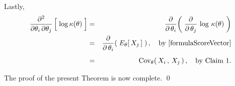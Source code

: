 \begin{enumerate}
	\vskip 0.5cm
	\noindent
	Lastly,
	\begin{eqnarray*}
	\dfrac{\partial^{2}}{\partial\theta_{i}\,\partial\theta_{j}} \left[\;\overset{{\color{white}.}}{\log} \, \kappa(\theta)\;\right]
	&=&
		\dfrac{\partial}{\partial\,\theta_{i}}\!
		\left(\;
			\dfrac{\partial}{\partial\,\theta_{j}}\, \log \, \kappa(\theta)
		\;\right)
	\\
	&=&
		\dfrac{\partial}{\partial\,\theta_{i}}\!
		\left(\; E_{\theta}\!\left[\,X_{j}\,\right] \;\right),
		\quad
		\textnormal{by \eqref{formulaScoreVector}}
	\\
	&\overset{{\color{white}\vert}}{=}&
		\Cov_{\theta}\!\left(\,X_{i}\,,\,X_{j}\,\right),
		\quad
		\textnormal{by Claim 1}.
	\end{eqnarray*}
\end{enumerate}
The proof of the present Theorem is now complete.
\qed


\renewcommand{\theenumi}{\roman{enumi}}
\renewcommand{\labelenumi}{\textnormal{(\theenumi)}$\;\;$}

